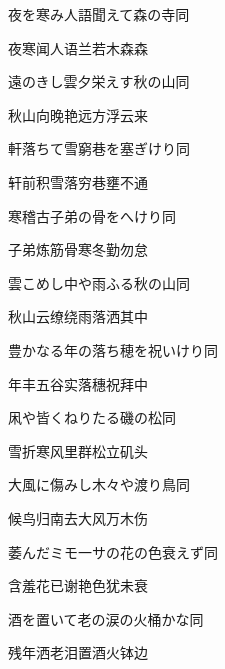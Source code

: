 \begin{haiku}
    {\FH 夜を寒み人語聞えて森の寺}\hfill{\FH 同}

    {\FK 夜寒闻人语兰若木森森}
\end{haiku}

\begin{haiku}
    {\FH 遠のきし雲夕栄えす秋の山}\hfill{\FH 同}

    {\FK 秋山向晚艳远方浮云来}
\end{haiku}

\begin{haiku}
    {\FH 軒落ちて雪窮巷を塞ぎけり}\hfill{\FH 同}

    {\FK 轩前积雪落穷巷壅不通}
\end{haiku}

\begin{haiku}
    {\FH 寒稽古子弟の骨をへけり}\hfill{\FH 同}

    {\FK 子弟炼筋骨寒冬勤勿怠}
\end{haiku}

\begin{haiku}
    {\FH 雲こめし中や雨ふる秋の山}\hfill{\FH 同}

    {\FK 秋山云缭绕雨落洒其中}
\end{haiku}

\begin{haiku}
    {\FH 豊かなる年の落ち穂を祝いけり}\hfill{\FH 同}

    {\FK 年丰五谷实落穗祝拜中}
\end{haiku}

\begin{haiku}
    {\FH 凩や皆くねりたる磯の松}\hfill{\FH 同}

    {\FK 雪折寒风里群松立矶头}
\end{haiku}

\begin{haiku}
    {\FH 大風に傷みし木々や渡り鳥}\hfill{\FH 同}

    {\FK 候鸟归南去大风万木伤}
\end{haiku}

\begin{haiku}
    {\FH 萎んだミモ一サの花の色衰えず}\hfill{\FH 同}

    {\FK 含羞花已谢艳色犹未衰}
\end{haiku}

\begin{haiku}
    {\FH 酒を置いて老の涙の火桶かな}\hfill{\FH 同}

    {\FK 残年洒老泪置酒火钵边}
\end{haiku}


